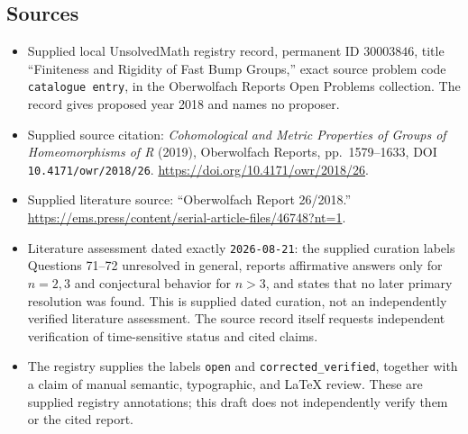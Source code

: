 \documentclass[11pt]{article}
\begin{document}
\subsection{Sources}
\begin{itemize}
\item Supplied local UnsolvedMath registry record, permanent ID \(30003846\), title ``Finiteness and Rigidity of Fast Bump Groups,'' exact source problem code \texttt{catalogue entry}, in the Oberwolfach Reports Open Problems collection. The record gives proposed year 2018 and names no proposer.
\item Supplied source citation: \emph{Cohomological and Metric Properties of Groups of Homeomorphisms of R} (2019), Oberwolfach Reports, pp.\ 1579--1633, DOI \texttt{10.4171/owr/2018/26}. \url{https://doi.org/10.4171/owr/2018/26}.
\item Supplied literature source: ``Oberwolfach Report 26/2018.'' \url{https://ems.press/content/serial-article-files/46748?nt=1}.
\item Literature assessment dated exactly \texttt{2026-08-21}: the supplied curation labels Questions 71--72 unresolved in general, reports affirmative answers only for \(n=2,3\) and conjectural behavior for \(n>3\), and states that no later primary resolution was found. This is supplied dated curation, not an independently verified literature assessment. The source record itself requests independent verification of time-sensitive status and cited claims.
\item The registry supplies the labels \texttt{open} and \texttt{corrected\_verified}, together with a claim of manual semantic, typographic, and LaTeX review. These are supplied registry annotations; this draft does not independently verify them or the cited report.
\end{itemize}
\end{document}
